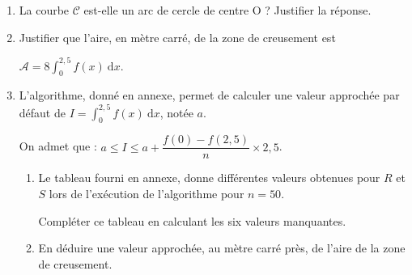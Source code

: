 \medskip

\begin{enumerate}
\item La courbe $\mathcal{C}$ est-elle un arc de cercle de centre O ? Justifier la réponse.
\item Justifier que l'aire, en mètre carré, de la zone de creusement est 

$\mathcal{A} = 8\displaystyle\int_0^{2,5}  f(x)\:\text{d}x$. 
\item L'algorithme, donné en annexe, permet de calculer une valeur approchée par défaut de $I = \displaystyle\int_0^{2,5}  f(x)\:\text{d}x$, notée $a$. 

On admet que : $a \leqslant  I \leqslant a + \dfrac{f(0) - f(2,5)}{n}\times  2,5$. 

	\begin{enumerate}
		\item Le tableau fourni en annexe, donne différentes valeurs obtenues pour $R$ et $S$ lors de l'exécution de l'algorithme pour $n = 50$. 

Compléter ce tableau en calculant les six valeurs manquantes. 
		\item En déduire une valeur approchée, au mètre carré près, de l'aire de la zone de creusement. 
	\end{enumerate}
\end{enumerate}
